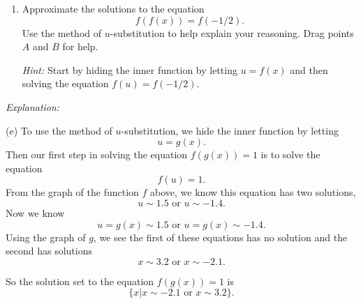 \documentclass{ximera}
\begin{document}
\begin{example}
\begin{enumerate}
\emph{Hint:}  Start by hiding the inner function by letting $u=f(x)$ and then solving the equation $f(u) =1$. See the Explanation below for help.

\item Approximate the solutions to the equation
\[
       f(f(x)) = f(-1/2).
\]
Use the method of $u$-substitution to help explain your reasoning. Drag points $A$ and $B$ for help. 

\emph{Hint:} Start by hiding the inner function by letting $u=f(x)$ and then solving the equation $f(u) = f(-1/2)$.

\end{enumerate}

\emph{Explanation:}

(e) To use the method of $u$-substitution, we hide the inner function by letting
\[
    u = g(x).
\]
Then our first step in solving the equation $f(g(x))=1$ is to solve the equation
\[
      f(u) = 1.
\]
From the graph of the function $f$ above, we know this equation has two solutions, 
\[
    u \sim 1.5  \text{ or } u\sim -1.4 .
\] 
Now we know
\[ 
    u = g(x) \sim 1.5 \text{ or } u = g(x) \sim -1.4.
\]
Using the graph of $g$, we see the first of these equations has no solution and the second has solutions
\[
   x \sim 3.2  \text{ or } x\sim -2.1 .
\]

So the solution set to the equation $f(g(x))= 1$ is
\[
      \{ x | x \sim -2.1 \text{ or } x\sim 3.2   \} .
\]




\end{example}
\end{document}
